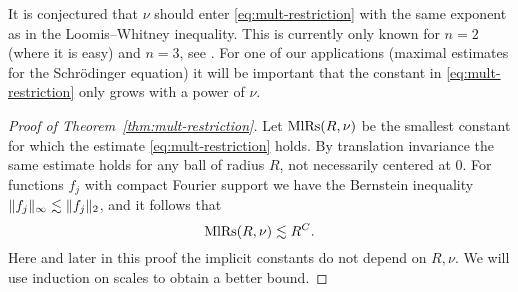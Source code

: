 It is conjectured that $\nu$ should enter \eqref{eq:mult-restriction} with the same exponent as in the Loomis--Whitney inequality.
This is currently only known for $n=2$ (where it is easy) and $n=3$, see \cite{MR3884636}.
For one of our applications (maximal estimates for the Schr\"odinger equation) it will be important that the constant in \eqref{eq:mult-restriction} only grows with a power of $\nu$.

\begin{proof}[Proof of Theorem~\ref{thm:mult-restriction}]
Let $\mathrm{MlRs}(R,\nu)$ be the smallest constant for which the estimate \eqref{eq:mult-restriction} holds.
By translation invariance the same estimate holds for any ball of radius $R$, not necessarily centered at $0$.
For functions $f_{j}$ with compact Fourier support we have the Bernstein inequality $\lVert f_{j}\rVert_{\infty} \lesssim \lVert f_{j}\rVert_{2}$, and it follows that
\begin{equation}
\label{eq:mult-restriction:trivial}
\mathrm{MlRs}(R,\nu) \lesssim R^{C}.
\end{equation}
Here and later in this proof the implicit constants do not depend on $R,\nu$.
We will use induction on scales to obtain a better bound.


\end{proof}
